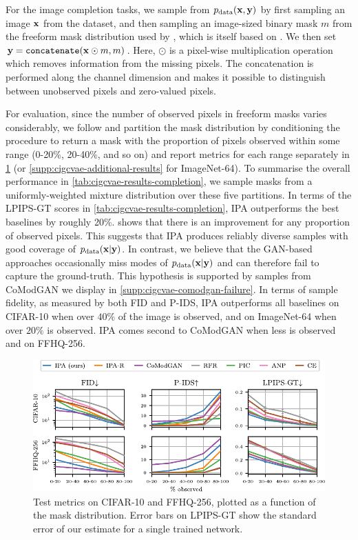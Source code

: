 For the image completion tasks, we sample from $p_{\rm{data}}{}(\mathbf{x}{}, \mathbf{y}{})$ by
first sampling an image $\mathbf{x}{}$ from the dataset, and then sampling an
image-sized binary mask $m$ from the freeform mask distribution used by
\citet{zhao2021large}, which is itself based on \citet{yu2018generative}. We
then set $\mathbf{y}{} = \texttt{concatenate}(\mathbf{x}{} \odot m, m)$. Here, $\odot$ is a
pixel-wise multiplication operation which removes information from the missing
pixels. The concatenation is performed along the channel dimension and makes it
possible to distinguish between unobserved pixels and zero-valued pixels.

For evaluation, since the number of observed pixels in freeform masks varies
considerably, we follow \citet{zhao2021large} and partition the mask
distribution by conditioning the procedure to return a mask with the proportion
of pixels observed within some range (0-20\%, 20-40\%, and so on) and report
metrics for each range separately in \cref{fig:cigcvae-metrics} (or
\cref{supp:cigcvae-additional-results} for ImageNet-64). To summarise the
overall performance in \cref{tab:cigcvae-results-completion}, we sample masks from a
uniformly-weighted mixture distribution over these five partitions. In terms of
the LPIPS-GT scores in \cref{tab:cigcvae-results-completion}, IPA outperforms the best
baselines by roughly 20\%.  shows that there is an improvement
for any proportion of observed pixels. This suggests that IPA produces reliably
diverse samples with good coverage of $p_{\rm{data}}{}(\mathbf{x}{}|\mathbf{y}{})$. In contrast, we
believe that the GAN-based approaches occasionally miss modes of
$p_{\rm{data}}{}(\mathbf{x}{}|\mathbf{y}{})$ and can therefore fail to capture the ground-truth.
This hypothesis is supported by samples from CoModGAN we display in
\cref{supp:cigcvae-comodgan-failure}. In terms of sample fidelity, as measured by both
FID and P-IDS, IPA outperforms all baselines on CIFAR-10 when over $40\%$ of the
image is observed, and on ImageNet-64 when over $20\%$ is observed. IPA comes
second to CoModGAN when less is observed and on FFHQ-256.

\begin{figure}[t]
  \centering
  \includegraphics[width=\textwidth]{figs/cigcvae/metrics}
  \caption{Test metrics on CIFAR-10 and FFHQ-256, plotted as a function of
    the mask distribution. Error bars on LPIPS-GT show the standard error of our
    estimate for a single trained network.}
  \label{fig:cigcvae-metrics}
  \vspace{-.5cm}
\end{figure}


